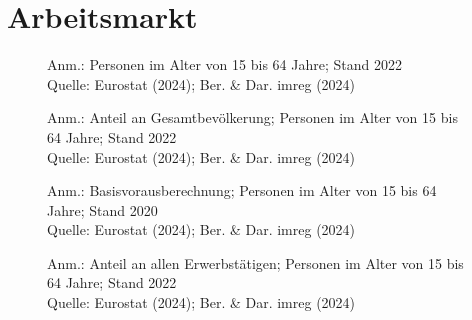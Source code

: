 
\section{Arbeitsmarkt}

\begin{figure}[p]
	{\centering {}}
	\label{map:erwerb}
	\begin{spacing}{1} \scriptsize
		Anm.: Personen im Alter von 15 bis 64 Jahre; Stand 2022\\
		Quelle: Eurostat (2024); Ber. \& Dar. imreg (2024) \end{spacing}
\end{figure}


\begin{figure}[p]
	{\centering {}}
	\label{map:erwerbquote}
	\begin{spacing}{1} \scriptsize
		Anm.: Anteil an Gesamtbevölkerung; Personen im Alter von 15 bis 64 Jahre; Stand 2022\\
		Quelle: Eurostat (2024); Ber. \& Dar. imreg (2024) \end{spacing}
\end{figure}


\begin{figure}[p]
	{\centering {}}
	\label{map:erwerbprognose}
	\begin{spacing}{1} \scriptsize
		Anm.: Basisvorausberechnung; Personen im Alter von 15 bis 64 Jahre; Stand 2020\\
		Quelle: Eurostat (2024); Ber. \& Dar. imreg (2024) \end{spacing}
\end{figure}


\begin{figure}[p]
	{\centering {}}
	\label{map:teilzeit}
	\begin{spacing}{1} \scriptsize
		Anm.: Anteil an allen Erwerbstätigen; Personen im Alter von 15 bis 64 Jahre; Stand 2022\\
		Quelle: Eurostat (2024); Ber. \& Dar. imreg (2024) \end{spacing}
\end{figure}


